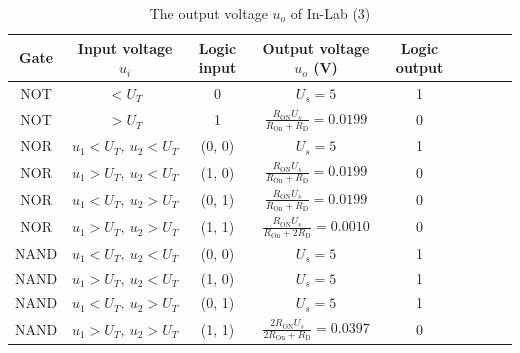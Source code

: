 \documentclass[UTF8]{report}
\theoremstyle{MyLineTheoremStyle} %
\theoremstyle{MyBlockTheoremStyle} %
\theoremstyle{MySubsubsectionStyle} %
\begin{document}
\begin{table}[H]\centering
    \caption{The output voltage $u_o$ of In-Lab (3)}
    \label{The output voltage of In-Lab (3)}
\begin{tabular}{ccccccccc}\toprule
    Gate & Input voltage $u_i$ & Logic input   & Output voltage $u_o$ (V) & Logic output  \\
    \hline
    NOT  & $< U_T$ & 0 &  $U_s = 5$ & 1 \\
    NOT  & $> U_T$ & 1 &  $\frac{R_{\text{ON}}U_s}{R_{\text{On}}+R_\text{D}} = 0.0199$ & 0 \\
    NOR  & $u_1 < U_T,\ u_2 < U_T $ & (0, 0) & $U_s = 5$ & 1\\
    NOR  & $u_1 > U_T,\ u_2 < U_T $ & (1, 0) & $\frac{R_{\text{ON}}U_s}{R_{\text{On}}+R_\text{D}} = 0.0199$ & 0 \\
    NOR  & $u_1 < U_T,\ u_2 > U_T $ & (0, 1) & $\frac{R_{\text{ON}}U_s}{R_{\text{On}}+R_\text{D}} = 0.0199$ & 0 \\
    NOR  & $u_1 > U_T,\ u_2 > U_T $ & (1, 1) & $\frac{R_{\text{ON}}U_s}{R_{\text{On}}+2R_\text{D}} = 0.0010$ & 0 \\
    NAND & $u_1 < U_T,\ u_2 < U_T $ & (0, 0) & $U_s = 5$ & 1\\
    NAND & $u_1 > U_T,\ u_2 < U_T $ & (1, 0) & $U_s = 5$ & 1\\
    NAND & $u_1 < U_T,\ u_2 > U_T $ & (0, 1) & $U_s = 5$ & 1\\
    NAND & $u_1 > U_T,\ u_2 > U_T $ & (1, 1) & $\frac{2R_{\text{ON}}U_s}{2R_{\text{On}}+R_\text{D}} = 0.0397$ & 0\\
    \bottomrule
\end{tabular}
\end{table}
\end{document}
